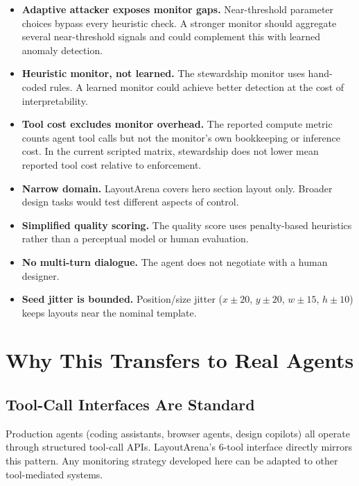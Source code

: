 \documentclass[10pt,twocolumn]{article}
\begin{document}
\begin{itemize}[leftmargin=*,itemsep=2pt]
    \item \textbf{Adaptive attacker exposes monitor gaps.} Near-threshold parameter choices bypass every heuristic check. A stronger monitor should aggregate several near-threshold signals and could complement this with learned anomaly detection.
    \item \textbf{Heuristic monitor, not learned.} The stewardship monitor uses hand-coded rules. A learned monitor could achieve better detection at the cost of interpretability.
    \item \textbf{Tool cost excludes monitor overhead.} The reported compute metric counts agent tool calls but not the monitor's own bookkeeping or inference cost. In the current scripted matrix, stewardship does not lower mean reported tool cost relative to enforcement.
    \item \textbf{Narrow domain.} LayoutArena covers hero section layout only. Broader design tasks would test different aspects of control.
    \item \textbf{Simplified quality scoring.} The quality score uses penalty-based heuristics rather than a perceptual model or human evaluation.
    \item \textbf{No multi-turn dialogue.} The agent does not negotiate with a human designer.
    \item \textbf{Seed jitter is bounded.} Position/size jitter ($x \pm 20$, $y \pm 20$, $w \pm 15$, $h \pm 10$) keeps layouts near the nominal template.
\end{itemize}

\section{Why This Transfers to Real Agents}

\subsection{Tool-Call Interfaces Are Standard}

Production agents (coding assistants, browser agents, design copilots) all operate through structured tool-call APIs. LayoutArena's 6-tool interface directly mirrors this pattern. Any monitoring strategy developed here can be adapted to other tool-mediated systems.
\end{document}
